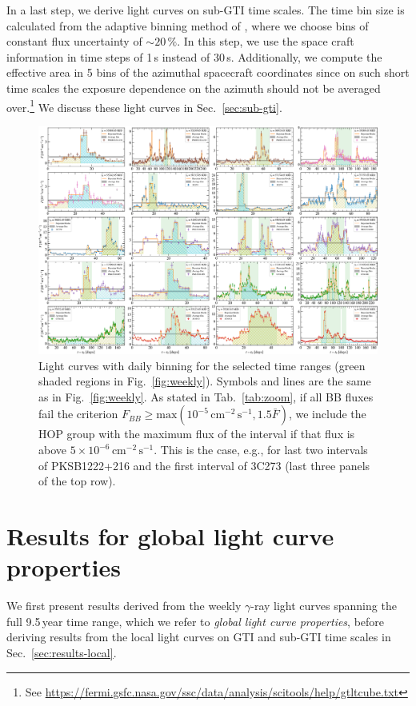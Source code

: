 \documentclass[twocolumn,linenumbers]{aastex62}
\newcommand{\gray}{$\gamma$-ray\xspace}
\begin{document}
In a last step, we derive light curves on sub-GTI time scales. 
The time bin size is calculated from the adaptive binning method of \citet{lott2012}, where we choose bins of constant flux uncertainty of $\sim20\,\%$. 
In this step, we use the space craft information in time steps of 1\,s instead of 30\,s. Additionally, we compute the effective area in 5 bins of the azimuthal spacecraft coordinates since on such short time scales the exposure dependence on the azimuth should not be averaged over.\footnote{See \url{https://fermi.gsfc.nasa.gov/ssc/data/analysis/scitools/help/gtltcube.txt}}
We discuss these light curves in Sec.~\ref{sec:sub-gti}.


\begin{figure}
    \centering
    \includegraphics[width = .99\linewidth]{figures/lc_daily_tsmin9.pdf}
    \caption{\label{fig:daily} Light curves with daily binning for the selected time ranges (green shaded regions in Fig.~\ref{fig:weekly}). Symbols and lines are the same as in Fig.~\ref{fig:weekly}. 
    As stated in Tab.~\ref{tab:zoom}, if all BB fluxes fail the criterion $F_{BB} \geqslant \mathrm{max}(10^{-5}\,\mathrm{cm}^{-2}\,\mathrm{s}^{-1}, 1.5 \bar{F})$, we include the HOP group with the maximum flux of the interval if that flux is above $5\times 10^{-6}\,\mathrm{cm}^{-2}\,\mathrm{s}^{-1}$. This is the case, e.g., for last two intervals of PKSB1222+216 and the first interval of 3C273 (last three panels of the top row).}
\end{figure}

\section{Results for global light curve properties}
\label{sec:results-global}
We first present results derived from the weekly \gray light curves spanning the full 9.5\,year time range, which we refer to \emph{global light curve properties}, before deriving results from the local light curves on GTI and sub-GTI time scales in Sec.~\ref{sec:results-local}.
\end{document}
